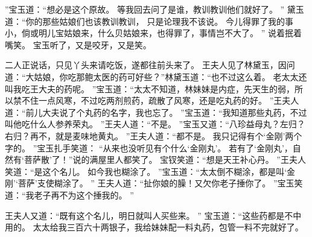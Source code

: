 ”宝玉道：“想必是这个原故。
等我回去问了是谁，教训教训他们就好了。
”
黛玉道：“你的那些姑娘们也该教训教训，
只是论理我不该说。
今儿得罪了我的事小，倘或明儿宝姑娘来，什么贝姑娘来，也得罪了，事情岂不大了。
” 
说着抿着嘴笑。
宝玉听了，又是咬牙，又是笑。
\par
二人正说话，只见丫头来请吃饭，遂都往前头来了。
王夫人见了林黛玉，因问道：“大姑娘，你吃那鲍太医的药可好些？”林黛玉道：“也不过这么着。
老太太还叫我吃王大夫的药呢。
”宝玉道：“太太不知道，林妹妹是内症，先天生的弱，所以禁不住一点风寒，不过吃两剂煎药，疏散了风寒，还是吃丸药的好。
”王夫人道：“前儿大夫说了个丸药的名字，我也忘了。
”宝玉道：“我知道那些丸药，不过叫他吃什么人参养荣丸。
”王夫人道：“不是。
”宝玉又道：“八珍益母丸？左归？右归？再不，就是麦味地黄丸。
”王夫人道：“都不是。
我只记得有个‘金刚’两个字的。
”宝玉扎手笑道：  “从来也没听见有个什么‘金刚丸’。
若有了‘金刚丸’，自然有‘菩萨散’了！”说的满屋里人都笑了。
宝钗笑道：“想是天王补心丹。
”王夫人笑道：“是这个名儿。
如今我也糊涂了。
”宝玉道：“太太倒不糊涂，都是叫‘金刚’‘菩萨’支使糊涂了。
”
王夫人道：“扯你娘的臊！又欠你老子捶你了。
”宝玉笑道：“我老子再不为这个捶我的。
”\par
王夫人又道：“既有这个名儿，明日就叫人买些来。
” 宝玉道：“这些药都是不中用的。
太太给我三百六十两银子，我给妹妹配一料丸药，包管一料不完就好了。
